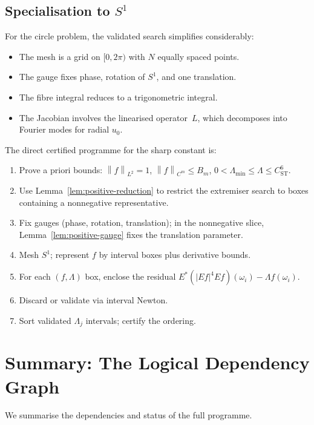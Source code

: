 \documentclass[12pt]{article}
\theoremstyle{definition}
\theoremstyle{remark}
\newcommand{\norm}[1]{\left\|#1\right\|}
\begin{document}
\subsection{Specialisation to $S^1$}

For the circle problem, the validated search simplifies considerably:
\begin{itemize}
  \item The mesh is a grid on $[0,2\pi)$ with $N$ equally spaced points.
  \item The gauge fixes phase, rotation of $S^1$, and one translation.
  \item The fibre integral reduces to a trigonometric integral.
  \item The Jacobian involves the linearised operator~$L$, which decomposes
    into Fourier modes for radial $u_0$.
\end{itemize}

The direct certified programme for the sharp constant is:
\begin{enumerate}[leftmargin=2em]
  \item Prove a priori bounds:
    $\norm{f}_{L^2}=1$, $\norm{f}_{C^m}\leq B_m$,
    $0<\Lambda_{\min}\leq\Lambda\leq C_{\mathrm{ST}}^6$.
  \item Use Lemma~\ref{lem:positive-reduction} to restrict the extremiser
    search to boxes containing a nonnegative representative.
  \item Fix gauges (phase, rotation, translation); in the nonnegative
    slice, Lemma~\ref{lem:positive-gauge} fixes the translation parameter.
  \item Mesh $S^1$; represent $f$ by interval boxes plus derivative bounds.
  \item For each $(f,\Lambda)$ box, enclose the residual
    $E^*(|Ef|^4Ef)(\omega_i)-\Lambda f(\omega_i)$.
  \item Discard or validate via interval Newton.
  \item Sort validated $\Lambda_j$ intervals; certify the ordering.
\end{enumerate}

\section{Summary: The Logical Dependency Graph}
\label{sec:dependency}

We summarise the dependencies and status of the full programme.
\end{document}
